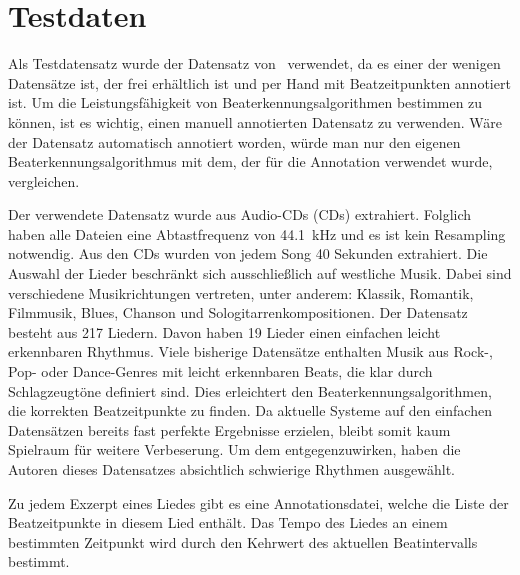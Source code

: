 \section{Testdaten} \label{konzept/testdaten}
{
	Als Testdatensatz wurde der Datensatz von~\cite{2012_HoDaZaOlGo} verwendet,
		da es einer der wenigen Datensätze ist,
		der frei erhältlich ist
		und per Hand mit Beatzeitpunkten annotiert ist.
	Um die Leistungsfähigkeit von Beaterkennungsalgorithmen bestimmen zu können,
		ist es wichtig,
		einen manuell annotierten Datensatz zu verwenden.
	Wäre der Datensatz automatisch annotiert worden,
		würde man nur den eigenen Beaterkennungsalgorithmus mit dem,
		der für die Annotation verwendet wurde,
		vergleichen.

	Der verwendete Datensatz wurde aus Audio-\acsp{CD} (\aclp{CD}) extrahiert.
	Folglich haben alle Dateien eine Abtastfrequenz von \SI{44.1}{\kilo\hertz}
		und es ist kein Resampling notwendig.
	Aus den \acp{CD} wurden von jedem Song \num{40} Sekunden extrahiert.
	Die Auswahl der Lieder beschränkt sich ausschlie{\ss}lich auf westliche Musik.
	Dabei sind verschiedene Musikrichtungen vertreten,
		unter anderem: Klassik, Romantik, Filmmusik, Blues, Chanson und Sologitarrenkompositionen.
	Der Datensatz besteht aus 217 Liedern.
	Davon haben 19 Lieder einen einfachen leicht erkennbaren Rhythmus.
	Viele bisherige Datensätze enthalten Musik aus Rock-, Pop- oder Dance-Genres
		mit leicht erkennbaren Beats,
		die klar durch Schlagzeugtöne definiert sind.
	Dies erleichtert den Beaterkennungsalgorithmen,
		die korrekten Beatzeitpunkte zu finden.
	Da aktuelle Systeme auf den einfachen Datensätzen bereits fast perfekte Ergebnisse erzielen,
		bleibt somit kaum Spielraum für weitere Verbeserung.
	Um dem entgegenzuwirken,
		haben die Autoren dieses Datensatzes absichtlich schwierige Rhythmen ausgewählt.

	Zu jedem Exzerpt eines Liedes gibt es eine Annotationsdatei,
		welche die Liste der Beatzeitpunkte in diesem Lied enthält.
	Das Tempo des Liedes an einem bestimmten Zeitpunkt wird durch den Kehrwert des aktuellen Beatintervalls bestimmt.
}

